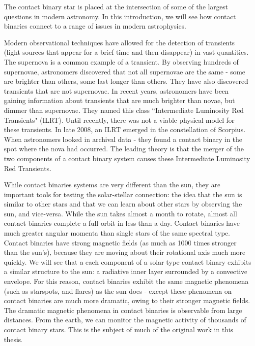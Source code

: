 \documentclass[12pt]{article} %
\numberwithin{equation}{section} %
\begin{document}
The contact binary star is placed at the intersection of some of the largest questions in modern astronomy. In this introduction, we will see how contact binaries connect to a range of issues in modern astrophysics.

Modern observational techniques have allowed for the detection of transients (light sources that appear for a brief time and then disappear) in vast quantities. The supernova  is a common example of a transient. By observing hundreds of supernovae, astronomers discovered that not all supernovae are the same - some are brighter than others, some last longer than others. They have also discovered transients that are not supernovae. In recent years, astronomers have been gaining information about transients that are much brighter than novae, but dimmer than supernovae. They named this class ``Intermediate Luminosity Red Transients" (ILRT). Until recently, there was not a viable physical model for these transients. In late 2008, an ILRT emerged in the constellation of Scorpius. When astronomers looked in archival data - they found a contact binary in the spot where the nova had occurred. The leading theory is that the merger of the two components of a contact binary system causes these Intermediate Luminosity Red Transients.

While contact binaries systems are very different than the sun, they are important tools for testing the solar-stellar connection: the idea that the sun is similar to other stars and that we can learn about other stars by observing the sun, and vice-versa. While the sun takes almost a month to rotate, almost all contact binaries complete a full orbit in less than a day. Contact binaries have much greater angular momenta than single stars of the same spectral type. Contact binaries have strong magnetic fields (as much as 1000 times stronger than the sun's), because they are moving about their rotational axis much more quickly. We will see that a each component of a solar type contact binary exhibits a similar structure to the sun: a radiative inner layer surrounded by a convective envelope. For this reason, contact binaries exhibit the same magnetic phenomena (such as starspots, and flares) as the sun does - except these phenomena on contact binaries are much more dramatic, owing to their stronger magnetic fields. The dramatic magnetic phenomena in contact binaries is observable from large distances. From the earth, we can monitor the magnetic activity of thousands of contact binary stars. This is the subject of much of the original work in this thesis.
\end{document}
